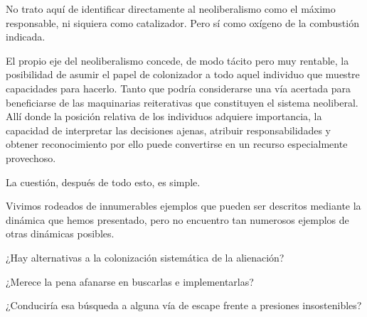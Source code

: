 \documentclass[12pt,a4paper]{article}
\begin{document}
No trato aquí de identificar directamente al neoliberalismo como el máximo responsable, ni siquiera como catalizador. Pero sí como oxígeno de la combustión indicada.

El propio eje del neoliberalismo concede, de modo tácito pero muy rentable, la posibilidad de asumir el papel de colonizador a todo aquel individuo que muestre capacidades para hacerlo. Tanto que podría considerarse una vía acertada para beneficiarse de las maquinarias reiterativas que constituyen el sistema neoliberal. Allí donde la posición relativa de los individuos adquiere importancia, la capacidad de interpretar las decisiones ajenas, atribuir responsabilidades y obtener reconocimiento por ello puede convertirse en un recurso especialmente provechoso.

La cuestión, después de todo esto, es simple.

Vivimos rodeados de innumerables ejemplos que pueden ser descritos mediante la dinámica que hemos presentado, pero no encuentro tan numerosos ejemplos de otras dinámicas posibles.

¿Hay alternativas a la colonización sistemática de la alienación?

¿Merece la pena afanarse en buscarlas e implementarlas?

¿Conduciría esa búsqueda a alguna vía de escape frente a presiones insostenibles?
\end{document}
